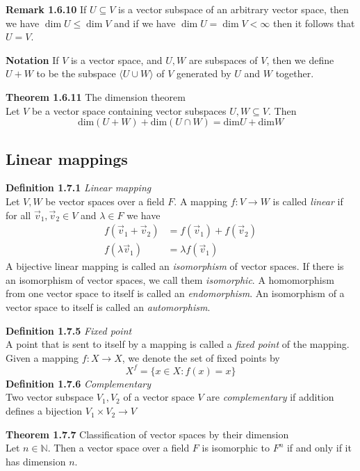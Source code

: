 \documentclass[8pt,landscape]{article}
\begin{document}
\begin{multicols}{3}
    \textbf{Remark 1.6.10}
    If $U \subseteq V$ is a vector subspace of an arbitrary vector space,
    then we have $\dim U \leq \dim V$ and if we have $\dim U = \dim V < \infty$
    then it follows that $U = V$.

    \textbf{Notation}
    If $V$ is a vector space, and $U, W$ are subspaces of $V$, then we define $U+W$
    to be the subspace $\langle U \cup W \rangle$ of $V$ generated by $U$ and $W$
    together.

    \textbf{Theorem 1.6.11} The dimension theorem \\
    Let $V$ be a vector space containing vector subspaces $U, W \subseteq V$.  Then
    \[
        \text{dim}(U+W) + \text{dim}(U \cap W) = \text{dim}U + \text{dim}W
    \]
    \subsection{Linear mappings}
    \textbf{Definition 1.7.1} \emph{Linear mapping} \\
    Let $V,W$ be vector spaces over a field $F$.
    A mapping $f: V \to W$ is called \emph{linear}
    if for all $\vec{v}_1, \vec{v}_2 \in V$ and $\lambda \in F$ we have
    \begin{align*}{}
        f(\vec{v}_1 + \vec{v}_2) & = f(\vec{v}_1) + f(\vec{v}_2) \\
        f(\lambda\vec{v}_1)         & = \lambda f(\vec{v}_1)
    \end{align*}
    A bijective linear mapping is called an \emph{isomorphism} of vector spaces.
    If there is an isomorphism of vector spaces, we call them \emph{isomorphic}.
    A homomorphism from one vector space to itself is called an \emph{endomorphism}.
    An isomorphism of a vector space to itself is called an \emph{automorphism}.

    \textbf{Definition 1.7.5} \emph{Fixed point} \\
    A point that is sent to itself by a mapping is called a \emph{fixed point} of the
    mapping.
    Given a mapping $f: X \to X$, we denote the set of fixed points by
    \[
        X^f = \{x \in X : f(x) = x\}
    \]
    \textbf{Definition 1.7.6} \emph{Complementary} \\
    Two vector subspace $V_1, V_2$ of a vector space $V$ are \emph{complementary} if
    addition defines a bijection
    $V_1 \times V_2 \to V$

    \textbf{Theorem 1.7.7} Classification of vector spaces by their dimension \\
    Let $n \in \mathbb{N}$.
    Then a vector space over a field $F$ is isomorphic to $F^n$ if and only if it has
    dimension $n$.


\end{multicols}
\end{document}
